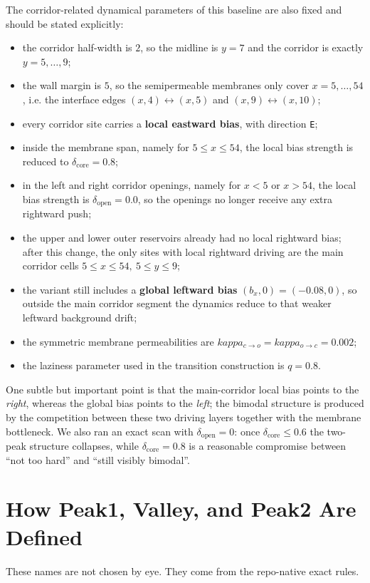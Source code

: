 \documentclass[11pt]{article}
\begin{document}
The corridor-related dynamical parameters of this baseline are also fixed and should be stated explicitly:
\begin{itemize}
  \item the corridor half-width is $2$, so the midline is $y=7$ and the corridor is exactly $y=5,\dots,9$;
  \item the wall margin is $5$, so the semipermeable membranes only cover $x=5,\dots,54$, i.e. the interface edges $(x,4)\leftrightarrow(x,5)$ and $(x,9)\leftrightarrow(x,10)$;
  \item every corridor site carries a \textbf{local eastward bias}, with direction \texttt{E};
  \item inside the membrane span, namely for $5 \le x \le 54$, the local bias strength is reduced to $\delta_{\mathrm{core}}=0.8$;
  \item in the left and right corridor openings, namely for $x<5$ or $x>54$, the local bias strength is $\delta_{\mathrm{open}}=0.0$, so the openings no longer receive any extra rightward push;
  \item the upper and lower outer reservoirs already had no local rightward bias; after this change, the only sites with local rightward driving are the main corridor cells $5 \le x \le 54,\ 5 \le y \le 9$;
  \item the variant still includes a \textbf{global leftward bias} $(b_x,0)=(-0.08,0)$, so outside the main corridor segment the dynamics reduce to that weaker leftward background drift;
  \item the symmetric membrane permeabilities are $kappa_{c\to o}=kappa_{o\to c}=0.002$;
  \item the laziness parameter used in the transition construction is $q=0.8$.
\end{itemize}
One subtle but important point is that the main-corridor local bias points to the \emph{right}, whereas the global bias points to the \emph{left}; the bimodal structure is produced by the competition between these two driving layers together with the membrane bottleneck. We also ran an exact scan with $\delta_{\mathrm{open}}=0$: once $\delta_{\mathrm{core}}\le 0.6$ the two-peak structure collapses, while $\delta_{\mathrm{core}}=0.8$ is a reasonable compromise between ``not too hard'' and ``still visibly bimodal''.

\section{How Peak1, Valley, and Peak2 Are Defined}
These names are not chosen by eye. They come from the repo-native exact rules.
\end{document}
